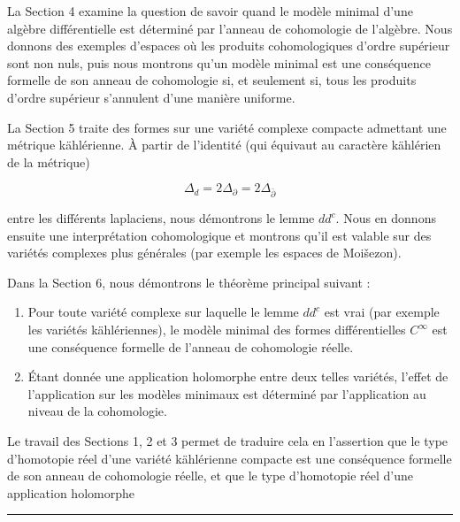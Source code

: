 \documentclass[
  french,
  a3paper,
  a3paper]{extarticle}
\begin{document}
La Section 4 examine la question de savoir quand le modèle minimal d'une
algèbre différentielle est déterminé par l'anneau de cohomologie de
l'algèbre. Nous donnons des exemples d'espaces où les produits
cohomologiques d'ordre supérieur sont non nuls, puis nous montrons qu'un
modèle minimal est une conséquence formelle de son anneau de cohomologie
si, et seulement si, tous les produits d'ordre supérieur s'annulent
d'une manière uniforme.

La Section 5 traite des formes sur une variété complexe compacte
admettant une métrique kählérienne. À partir de l'identité (qui équivaut
au caractère kählérien de la métrique)

\[
\Delta_d=2\Delta_{\partial}=2\Delta_{\bar\partial}
\]

entre les différents laplaciens, nous démontrons le lemme \(dd^c\). Nous
en donnons ensuite une interprétation cohomologique et montrons qu'il
est valable sur des variétés complexes plus générales (par exemple les
espaces de Moišezon).

Dans la Section 6, nous démontrons le théorème principal suivant :

\begin{enumerate}
\def\labelenumi{\arabic{enumi})}
\item
  Pour toute variété complexe sur laquelle le lemme \(dd^c\) est vrai
  (par exemple les variétés kählériennes), le modèle minimal des formes
  différentielles \(C^\infty\) est une conséquence formelle de l'anneau
  de cohomologie réelle.
\item
  Étant donnée une application holomorphe entre deux telles variétés,
  l'effet de l'application sur les modèles minimaux est déterminé par
  l'application au niveau de la cohomologie.
\end{enumerate}

Le travail des Sections 1, 2 et 3 permet de traduire cela en l'assertion
que le type d'homotopie réel d'une variété kählérienne compacte est une
conséquence formelle de son anneau de cohomologie réelle, et que le type
d'homotopie réel d'une application holomorphe

\clearpage



\par

\vspace{0.7mm}\hrule\vspace{1.6mm}
\end{document}
